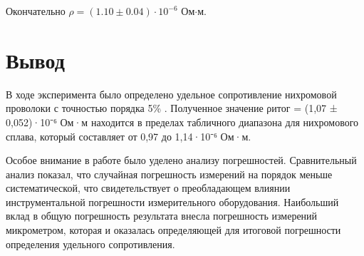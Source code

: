 \documentclass[a4paper]{article}
\begin{document}
Окончательно $\rho = (1.10 \pm 0.04)\cdot 10^{-6}$ Ом$\cdot$м.

\section{Вывод}
В ходе эксперимента было определено удельное сопротивление нихромовой проволоки с точностью порядка  {5\%} . Полученное значение ρитог = (1,07 ± 0,052)·10⁻⁶ Ом·м находится в пределах табличного диапазона для нихромового сплава, который составляет от 0,97 до 1,14·10⁻⁶ Ом·м.

Особое внимание в работе было уделено анализу погрешностей. Сравнительный анализ показал, что случайная погрешность измерений на порядок меньше систематической, что свидетельствует о преобладающем влиянии инструментальной погрешности измерительного оборудования. Наибольший вклад в общую погрешность результата внесла погрешность измерений микрометром, которая и оказалась определяющей для итоговой погрешности определения удельного сопротивления.
\end{document}
